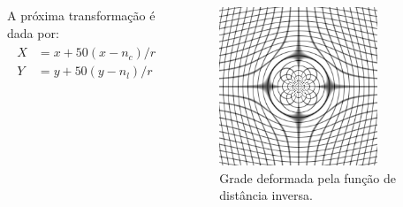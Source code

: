 \documentclass[t]{beamer}
\begin{document}
\begin{frame}
   \begin{columns}[c]
        A próxima transformação é dada por:
        \begin{align}
        \begin{split}
            X &= x + 50(x-n_c)/r \\
            Y &= y + 50(y-n_l)/r 
        \end{split} 
        \end{align}
        \begin{figure}[!h]
          \begin{center}
            \includegraphics[width=0.8\textwidth]{figuras/gridDist.png}
            \caption{Grade deformada pela função de distância inversa.}
          \end{center}
        \end{figure}
    \end{columns}
\end{frame}
\end{document}
